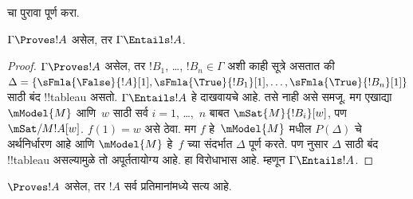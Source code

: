 \documentclass[../../../include/open-logic-section]{subfiles}
\begin{document}
\begin{prob}
 चा
पुरावा पूर्ण करा.
\end{prob}

\begin{cor}
$\Gamma \Proves !A$ असेल, तर
$\Gamma \Entails !A$.
\end{cor}

\begin{proof}
  $\Gamma \Proves !A$ असेल, तर
  $!B_1$, \dots, $!B_n \in \Gamma$ अशी काही सूत्रे
  असतात की $\Delta =
  \{\sFmla{\False}{!A}[1], \sFmla{\True}{!B_1}[1],
  \dots, \sFmla{\True}{!B_n}[1]\}$ साठी
  बंद !!{tableau} असतो.
  $\Gamma \Entails !A$ हे दाखवायचे आहे.
  तसे नाही असे समजू. मग एखाद्या
  $\mModel{M}$ आणि~$w$ साठी सर्व
  $i=1$, \dots,~$n$ बाबत
  $\mSat{M}{!B_i}[w]$, पण
  $\mSat/{M}{!A}[w]$. $f(1) = w$
  असे ठेवा. मग $f$ हे~$\mModel{M}$ मधील
  $P(\Delta)$ चे अर्थनिर्धारण आहे आणि
  $\mModel{M}$ हे~$f$ च्या संदर्भात
  $\Delta$ पूर्ण करते. पण
   नुसार
  $\Delta$ साठी बंद !!{tableau} असल्यामुळे
  तो अपूर्ततायोग्य आहे. हा विरोधाभास आहे.
  म्हणून $\Gamma \Entails !A$.
\end{proof}

\begin{cor}
$\Proves !A$ असेल, तर $!A$ सर्व
प्रतिमानांमध्ये सत्य आहे.
\end{cor}
\end{document}
